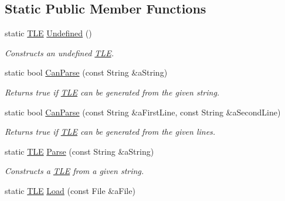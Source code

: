 \subsection*{Static Public Member Functions}
\begin{DoxyCompactItemize}
\item 
static \hyperlink{classostk_1_1astro_1_1trajectory_1_1orbit_1_1models_1_1sgp4_1_1_t_l_e}{T\+LE} \hyperlink{classostk_1_1astro_1_1trajectory_1_1orbit_1_1models_1_1sgp4_1_1_t_l_e_a871cdedd5bc51c9f3afa976e0597ea51}{Undefined} ()
\begin{DoxyCompactList}\small\item\em Constructs an undefined \hyperlink{classostk_1_1astro_1_1trajectory_1_1orbit_1_1models_1_1sgp4_1_1_t_l_e}{T\+LE}. \end{DoxyCompactList}\item 
static bool \hyperlink{classostk_1_1astro_1_1trajectory_1_1orbit_1_1models_1_1sgp4_1_1_t_l_e_a843f3432e8411de6b8d7e9c40d7191d2}{Can\+Parse} (const String \&a\+String)
\begin{DoxyCompactList}\small\item\em Returns true if \hyperlink{classostk_1_1astro_1_1trajectory_1_1orbit_1_1models_1_1sgp4_1_1_t_l_e}{T\+LE} can be generated from the given string. \end{DoxyCompactList}\item 
static bool \hyperlink{classostk_1_1astro_1_1trajectory_1_1orbit_1_1models_1_1sgp4_1_1_t_l_e_a1e808cef2bd2466a8d7813f2c5d5bfc4}{Can\+Parse} (const String \&a\+First\+Line, const String \&a\+Second\+Line)
\begin{DoxyCompactList}\small\item\em Returns true if \hyperlink{classostk_1_1astro_1_1trajectory_1_1orbit_1_1models_1_1sgp4_1_1_t_l_e}{T\+LE} can be generated from the given lines. \end{DoxyCompactList}\item 
static \hyperlink{classostk_1_1astro_1_1trajectory_1_1orbit_1_1models_1_1sgp4_1_1_t_l_e}{T\+LE} \hyperlink{classostk_1_1astro_1_1trajectory_1_1orbit_1_1models_1_1sgp4_1_1_t_l_e_a7f97a74af47895aa315aebc52f410d26}{Parse} (const String \&a\+String)
\begin{DoxyCompactList}\small\item\em Constructs a \hyperlink{classostk_1_1astro_1_1trajectory_1_1orbit_1_1models_1_1sgp4_1_1_t_l_e}{T\+LE} from a given string. \end{DoxyCompactList}\item 
static \hyperlink{classostk_1_1astro_1_1trajectory_1_1orbit_1_1models_1_1sgp4_1_1_t_l_e}{T\+LE} \hyperlink{classostk_1_1astro_1_1trajectory_1_1orbit_1_1models_1_1sgp4_1_1_t_l_e_a5e912145266460d05beaba326b5ace95}{Load} (const File \&a\+File)

\end{DoxyCompactItemize}
